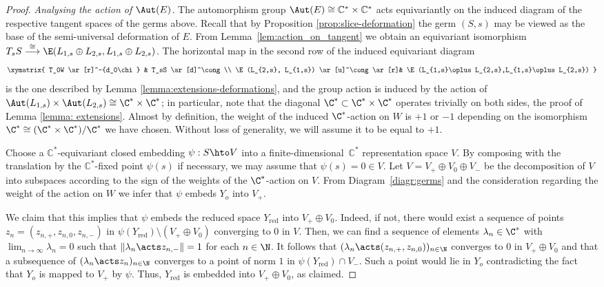 \begin{proof}
\noindent\emph{Analysing the action of $\Aut(E)$.} The automorphism group $\Aut(E) \cong \mathbb{C}^* \times \mathbb{C}^*$ acts equivariantly on the induced diagram of the respective tangent spaces of the germs above.
Recall that by Proposition \ref{prop:slice-deformation} the germ $(S,s)$ may be viewed as the base of the semi-universal deformation of $E$. From Lemma~\ref{lem:action_on_tangent} we obtain an equivariant isomorphism $T_s S \overset{\cong}{\longrightarrow} \E(L_{1,s}\oplus L_{2,s},L_{1,s}\oplus L_{2,s})$. The horizontal map in the second row of the induced equivariant diagram
\[\xymatrix{
T_0W \ar[r]^-{d_0\chi} & T_sS \ar[d]^\cong \\
\E(L_{2,s}, L_{1,s}) \ar[u]^\cong \ar[r]& \E(L_{1,s}\oplus L_{2,s},L_{1,s}\oplus L_{2,s})
}
\]
is the one described by Lemma \ref{lemma:extensions-deformations}, and the group action is induced by the action of $\Aut(L_{1,s})\times\Aut(L_{2,s})\cong\C^*\times\C^*$; in particular, note that the diagonal $\C^*\subset\C^*\times\C^*$ operates trivially on both sides, \cf the proof of Lemma \ref{lemma: extensions}. Almost by definition, the weight of the induced $\C^*$-action on $W$ is $+1$ or $-1$ depending on the isomorphism $\C^*\cong(\C^*\times\C^*)/\C^*$ we have chosen. Without loss of generality, we will assume it to be equal to
$+1$.

Choose a $\mathbb{C}^*$-equivariant closed embedding $\psi :S \hto V$ into a finite-dimensional~$\mathbb{C}^*$ representation space $V$. By composing with the translation by the $\mathbb{C}^*$-fixed point $\psi(s)$ if necessary, we may assume that $\psi(s) = 0 \in V$. Let $V=V_+\oplus V_0\oplus V_-$ be the decomposition of $V$ into subspaces according to the sign of the weights of the $\C^*$-action on $V$. From Diagram~\eqref{diagr:germs} and the consideration regarding the weight of the action on $W$ we infer that $\psi$ embeds $Y_o$ into $V_+$.

We claim that this implies that $\psi$ embeds the reduced space $Y_{\mathrm{red}}$ into $V_+\oplus V_0$. Indeed, if not, there would exist a sequence of points $z_n=(z_{n,+},z_{n,0},z_{n,-})$ in $\psi(Y_{\mathrm{red}})\setminus (V_+\oplus V_0)$ converging to $0$ in $V$.
Then, we can find a sequence of elements $\lambda_n\in \C^*$ with $\lim_{n \to \infty} \lambda_n = 0$ such that $\Vert\lambda_n \acts z_{n,-} \Vert=1$ for each $n\in \N$. It follows that $(\lambda_n \acts (z_{n,+},z_{n,0}))_{n\in \N}$ converges to $0$ in $V_+\oplus V_0$ and that a subsequence of $(\lambda_n \acts z_{n})_{n \in \N}$ converges to a point of norm $1$ in $\psi(Y_{\mathrm{red}})\cap V_-$. Such a point would lie in $Y_o$ contradicting the fact that $Y_o$ is mapped to $V_+$ by $\psi$. Thus, $Y_{\mathrm{red}}$ is embedded into $V_+\oplus V_0$, as claimed.


\end{proof}
